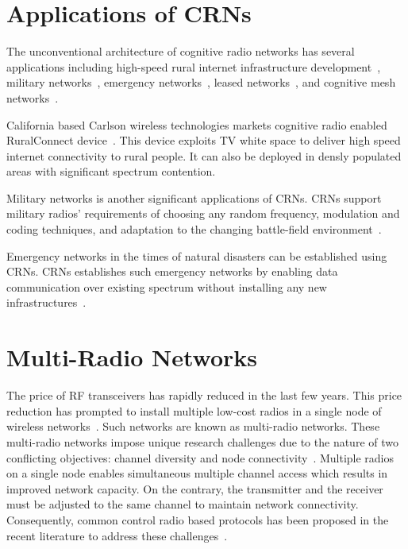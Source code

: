 \section{Applications of CRNs}
The unconventional architecture of cognitive radio networks has several applications including high-speed rural internet infrastructure development~\cite{fitch2011wireless}, military networks~\cite{murty2003software}, emergency networks~\cite{maldonado2005cognitive}, leased networks~\cite{stine2005spectrum}, and cognitive mesh networks~\cite{berlemann2005policy}.

California based Carlson wireless technologies markets cognitive radio enabled RuralConnect device~\cite{ruralConnect}. This device exploits TV white space to deliver high speed internet connectivity to rural people. It can also be deployed in densly populated areas with significant spectrum contention.

Military networks is another significant applications of CRNs. CRNs support military radios' requirements of choosing any random frequency, modulation and coding techniques, and adaptation to the changing battle-field environment~\cite{akyildiz2006next}.

Emergency networks in the times of natural disasters can be established using CRNs. CRNs establishes such emergency networks by enabling data communication over existing spectrum without installing any new infrastructures~\cite{maldonado2005cognitive}.

\section{Multi-Radio Networks}

The price of RF transceivers has rapidly reduced in the last few years. This price reduction has prompted to install multiple low-cost radios in a single node of wireless networks~\cite{raniwala2005architecture}. Such networks are known as multi-radio networks. These multi-radio networks impose unique research challenges due to the nature of two conflicting objectives: channel diversity and node connectivity~\cite{wang2007survey}. Multiple radios on a single node enables simultaneous multiple channel access which results in improved network capacity. On the contrary, the transmitter and the receiver must be adjusted to the same channel to maintain network connectivity. Consequently, common control radio based protocols has been proposed in the recent literature to address these challenges~\cite{ko2007distributed, al2016channel, gabale2013classification, kyasanur2006routing, chatterjee2013low}.

